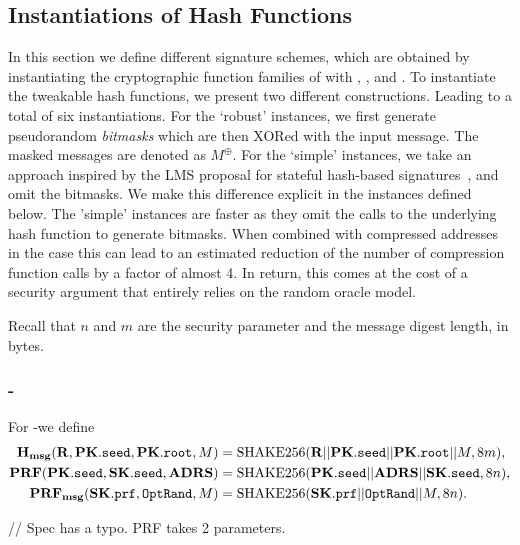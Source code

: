 

\subsection{Instantiations of Hash Functions}
\label{subsec:instanthash}
In this section we define different signature schemes, which are obtained
by instantiating the cryptographic function families of \spx with \shatwo,
\shathree, and \haraka. To instantiate the tweakable hash functions,
we present two different constructions. Leading to a total of six instantiations.
For the `robust' instances,
we first generate pseudorandom \emph{bitmasks}
which are then XORed with the input message. The masked messages are denoted
as $M^{\oplus}$.
For the `simple' instances, we take an approach inspired by the LMS proposal for stateful hash-based signatures~\cite{LMSdraft}, and omit the bitmasks.
We make this difference explicit in the instances defined below. The 'simple' instances
are faster as they omit the calls to the underlying hash function to generate bitmasks. When combined with compressed addresses in the \shatwo case this can lead to an estimated reduction of the number of
compression function calls by a factor of almost 4. In return, this comes at the cost of a
security argument that entirely relies on the random oracle model.

Recall that $n$ and $m$ are the security parameter and the message digest length, in bytes.

\subsubsection{\spx-\shathree}
   For \spx-\shathree we define
   \begin{equation}
      \begin{aligned}
         \mathbf{H_{msg}}(\mathbf{R},\mathbf{PK}.\texttt{seed}, \mathbf{PK}.\texttt{root}, M) &= \text{SHAKE256}(\mathbf{R} || \mathbf{PK}.\texttt{seed} || \mathbf{PK}.\texttt{root} || M, 8m),\\
         \mathbf{PRF}(\mathbf{PK}.\texttt{seed}, \mathbf{SK}.\texttt{seed}, \textbf{ADRS}) &= \text{SHAKE256}(\mathbf{PK}.\texttt{seed} || \textbf{ADRS} || \mathbf{SK}.\texttt{seed}, 8n),\\
         \mathbf{PRF_{msg}}(\mathbf{SK}.\texttt{prf}, \texttt{OptRand}, M) &= \text{SHAKE256}(\mathbf{SK}.\texttt{prf} || \texttt{OptRand} || M, 8n).\\
      \end{aligned}
    \end{equation}

\begin{code}
  // Spec has a typo. PRF takes 2 parameters.
\end{code}

